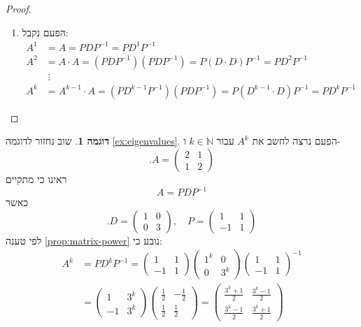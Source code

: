 \documentclass[12pt]{report}
\theoremstyle{plain}
\theoremstyle{definition}
\newtheorem{example}{דוגמה}[chapter]
\newcommand{\N}{\mathbb{N}}
\newcommand{\0}{\mathbf{0}}
\begin{document}
\begin{proof}
\begin{enumerate}[label=\alph*.]
\item 
הפעם נקבל:
$$
\begin{aligned}
A^1&=A=PDP^{-1}=PD^1P^{-1} \\
A^2&=A\cdot A=(PDP^{-1})(PDP^{-1})=P(D\cdot D)P^{-1}=PD^2P^{-1} \\
&\;\vdots \\
A^k&=A^{k-1}\cdot A=(PD^{k-1}P^{-1})(PDP^{-1})=P(D^{k-1}\cdot D)P^{-1}=PD^kP^{-1}
\end{aligned}
$$


\end{enumerate}
\end{proof}

\begin{example}
שוב נחזור לדוגמה
\ref{ex:eigenvalues}.
הפעם נרצה לחשב את
$A^k$
עבור
$k\in\N$
ו-
$$
.A=\begin{pmatrix}
2 & 1 \\
1 & 2
\end{pmatrix}
$$
ראינו כי מתקיים
$$
A=PDP^{-1}
$$
כאשר
$$
.D=\begin{pmatrix}
1 & 0 \\
0 & 3
\end{pmatrix},\quad P=\begin{pmatrix}
1 & 1 \\
-1 & 1
\end{pmatrix}
$$
לפי טענה
\ref{prop:matrix-power}
נובע כי:
$$
\begin{aligned}
A^k&=PD^kP^{-1}=\begin{pmatrix}
1 & 1 \\
-1 & 1
\end{pmatrix}\begin{pmatrix}
1^k & 0 \\
0 & 3^k
\end{pmatrix}\begin{pmatrix}
1 & 1 \\
-1 & 1
\end{pmatrix}^{-1} \\
&=\begin{pmatrix}
1 & 3^k \\
-1 & 3^k
\end{pmatrix}\begin{pmatrix}
\frac{1}{2} & -\frac{1}{2} \\
\frac{1}{2} & \frac{1}{2}
\end{pmatrix}=\begin{pmatrix}
\frac{3^k+1}{2} & \frac{3^k-1}{2} \\
\frac{3^k-1}{2} & \frac{3^k+1}{2}
\end{pmatrix}
\end{aligned}
$$

\end{example}
\end{document}
